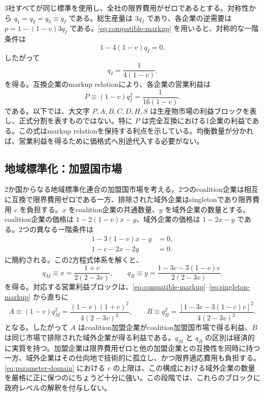 3社すべてが同じ標準を使用し、全社の限界費用がゼロであるとする。対称性から $q_1=q_2=q_3\equiv q_I$ である。総生産量は $3q_I$ であり、各企業の逆需要は $p=1-(1-v)3q_I$ である。\eqref{eq:compatible-markup} を用いると、対称的な一階条件は
\begin{equation}
    1-4(1-v)q_I=0.
    \label{eq:foc-complete}
\end{equation}
したがって
\begin{equation}
    q_I=\frac{1}{4(1-v)}.
    \label{eq:qI}
\end{equation}
を得る。互換企業のmarkup relationにより、各企業の営業利益は
\begin{equation}
    P\equiv(1-v)q_I^2=\frac{1}{16(1-v)}.
    \label{eq:profit-P}
\end{equation}
である。以下では、大文字 $P,A,B,C,D,H,S$ は生産物市場の利益ブロックを表し、正式分割を表すものではない。特に $P$ は完全互換における1企業の利益である。この式はmarkup relationを保持する利点を示している。均衡数量が分かれば、営業利益を得るために価格式へ別途代入する必要がない。

\subsection{地域標準化：加盟国市場}
\label{subsec:product-market-su-member}

2か国からなる地域標準化連合の加盟国市場を考える。2つのcoalition企業は相互に互換で限界費用ゼロである一方、排除された域外企業はsingletonであり限界費用 $c$ を負担する。$x$ をcoalition企業の共通数量、$y$ を域外企業の数量とする。coalition企業の価格は $1-2(1-v)x-y$、域外企業の価格は $1-2x-y$ である。2つの異なる一階条件は
\begin{align}
    1-3(1-v)x-y&=0, \label{eq:foc-su-member-compatible}\\
    1-c-2x-2y&=0. \label{eq:foc-su-member-outsider}
\end{align}
に簡約される。この2方程式体系を解くと、
\begin{equation}
    q_M\equiv x=\frac{1+c}{2(2-3v)},
    \qquad
    q_B\equiv y=\frac{1-3c-3(1-c)v}{2(2-3v)}.
    \label{eq:quantities-su-member}
\end{equation}
を得る。対応する営業利益ブロックは、\eqref{eq:compatible-markup}--\eqref{eq:singleton-markup} から直ちに
\begin{equation}
    A\equiv(1-v)q_M^2
    =\frac{(1-v)(1+c)^2}{4(2-3v)^2},
    \qquad
    B\equiv q_B^2
    =\frac{[1-3c-3(1-c)v]^2}{4(2-3v)^2}.
    \label{eq:profits-su-member}
\end{equation}
となる。したがって $A$ はcoalition加盟企業がcoalition加盟国市場で得る利益、$B$ は同じ市場で排除された域外企業が得る利益である。$q_M$ と $q_B$ の区別は経済的に実質を持つ。加盟企業は限界費用ゼロと他の加盟企業との互換性を同時に持つ一方、域外企業はその仕向地で技術的に孤立し、かつ限界適応費用も負担する。\eqref{eq:parameter-domain} における $c$ の上限は、この構成における域外企業の数量を厳格に正に保つのにちょうど十分に強い。この段階では、これらのブロックに政府レベルの解釈を付与しない。

